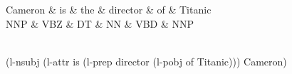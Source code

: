 \documentclass{article}
\begin{document}
\thispagestyle{empty}
\begin{center}
 \begin{dependency}[theme = default]
   \begin{deptext}[column sep=1em]
   Cameron \& is \& the \& director \& of \& Titanic \\
   NNP \& VBZ \& DT \& NN \& VBD \& NNP \\
   \end{deptext}
\end{dependency} \\
(l-nsubj (l-attr is (l-prep director (l-pobj of Titanic))) Cameron)
\end{center}
\end{document}
